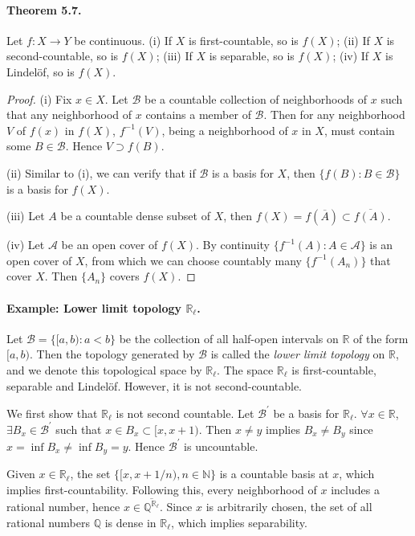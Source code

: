 \documentclass{article}
\numberwithin{equation}{section}
\theoremstyle{plain}
\theoremstyle{definition}
\begin{document}
\paragraph{Theorem 5.7.\label{thm:5.7}} Let $f:X\to Y$ be continuous.
(i) If $X$ is first-countable, so is $f(X)$; (ii) If $X$ is second-countable, so is $f(X)$; (iii) If $X$ is separable, so is $f(X)$; (iv) If $X$ is Lindelöf, so is $f(X)$.
\begin{proof}
(i) Fix $x\in X$. Let $\mathscr{B}$ be a countable collection of neighborhoods of $x$ such that any neighborhood of $x$ contains a member of $\mathscr{B}$. Then for any neighborhood $V$ of $f(x)$ in $f(X)$, $f^{-1}(V)$, being a neighborhood of $x$ in $X$, must contain some $B\in\mathscr{B}$. Hence $V\supset f(B)$.

(ii) Similar to (i), we can verify that if $\mathscr{B}$ is a basis for $X$, then $\{f(B):B\in\mathscr{B}\}$ is a basis for $f(X)$.

(iii) Let $A$ be a countable dense subset of $X$, then $f(X)=f(\overline{A})\subset\overline{f(A)}$.

(iv) Let $\mathscr{A}$ be an open cover of $f(X)$. By continuity $\{f^{-1}(A):A\in\mathscr{A}\}$ is an open cover of $X$, from which we can choose countably many $\{f^{-1}(A_n)\}$ that cover $X$. Then $\{A_n\}$ covers $f(X)$.
\end{proof}

\paragraph{Example: Lower limit topology $\mathbb{R}_\ell$.} Let $\mathscr{B}=\{[a,b):a<b\}$ be the collection of all half-open intervals on $\mathbb{R}$ of the form $[a,b)$. Then the topology generated by $\mathscr{B}$ is called the \textit{lower limit topology} on $\mathbb{R}$, and we denote this topological space by $\mathbb{R}_\ell$. The space $\mathbb{R}_\ell$ is first-countable, separable and Lindelöf. However, it is not second-countable.

We first show that $\mathbb{R}_\ell$ is not second countable. Let $\mathscr{B}^\prime$ be a basis for $\mathbb{R}_\ell$. $\forall x\in\mathbb{R}$, $\exists B_x\in\mathscr{B}^\prime$ such that $x\in B_x\subset[x,x+1)$. Then $x\neq y$ implies $B_x\neq B_y$ since $x=\inf B_x\neq \inf B_y=y$. Hence $\mathscr{B}^\prime$ is uncountable.

Given $x\in\mathbb{R}_\ell$, the set $\{[x,x+1/n),n\in\mathbb{N}\}$ is a countable basis at $x$, which implies first-countability. Following this, every neighborhood of $x$ includes a rational number, hence $x\in\overline{\mathbb{Q}^{\mathbb{R}_\ell}}$. Since $x$ is arbitrarily chosen, the set of all rational numbers $\mathbb{Q}$ is dense in $\mathbb{R}_\ell$, which implies separability.
\end{document}
